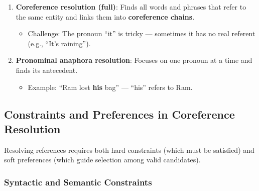 \documentclass[11pt,a4paper]{article}
\begin{document}
\begin{enumerate}
    \item \textbf{Coreference resolution (full)}: Finds all words and phrases that refer to the same entity and links them into \textbf{coreference chains}.
    \begin{itemize}
        \item Challenge: The pronoun ``it'' is tricky --- sometimes it has no real referent (e.g., ``It's raining'').
    \end{itemize}
    
    \item \textbf{Pronominal anaphora resolution}: Focuses on one pronoun at a time and finds its antecedent.
    \begin{itemize}
        \item Example: ``Ram lost \textbf{his} bag'' --- ``his'' refers to Ram.
    \end{itemize}
\end{enumerate}

\subsection{Constraints and Preferences in Coreference Resolution}

Resolving references requires both hard constraints (which must be satisfied) and soft preferences (which guide selection among valid candidates).

\subsubsection{Syntactic and Semantic Constraints}
\end{document}
